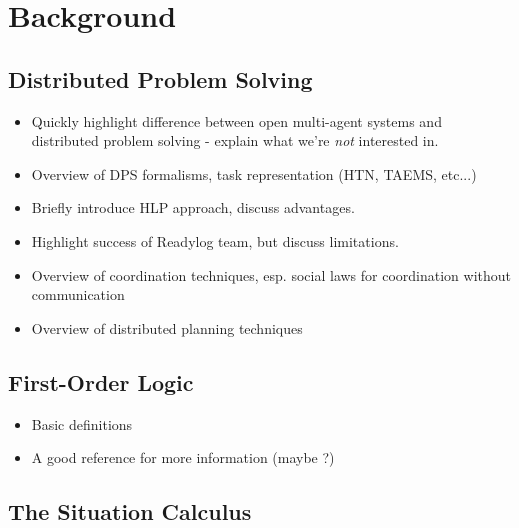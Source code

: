 \chapter{Background}\label{ch:background}

\section{Distributed Problem Solving}

\begin{itemize}
\item Quickly highlight difference between open multi-agent systems and
distributed problem solving - explain what we're \emph{not} interested in.
\item Overview of DPS formalisms, task representation (HTN, TAEMS, etc...)
\item Briefly introduce HLP approach, discuss advantages.
\item Highlight success of Readylog team, but discuss limitations.
\item Overview of coordination techniques, esp. social laws for coordination without communication
\item Overview of distributed planning techniques
\end{itemize}

\section{First-Order Logic}

\begin{itemize}
\item Basic definitions
\item A good reference for more information (maybe \cite{fitting96fol_book}?)
\end{itemize}

\section{The Situation Calculus}

